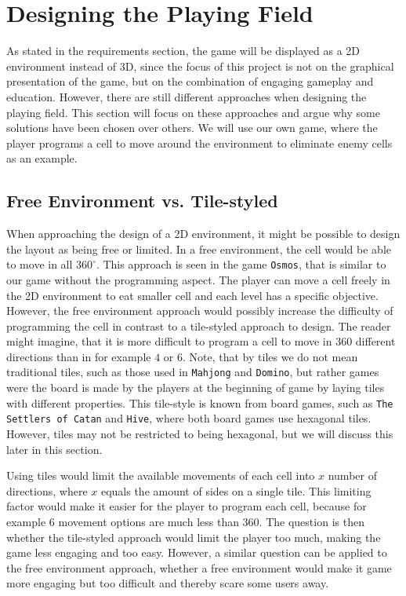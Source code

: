 \section{Designing the Playing Field}
\label{sec:designing_playing_field}

As stated in the requirements section, the game will be displayed as a 2D environment instead of 3D, since the focus of this project is not on the graphical presentation of the game, but on the combination of engaging gameplay and education.
However, there are still different approaches when designing the playing field.
This section will focus on these approaches and argue why some solutions have been chosen over others.
We will use our own game, where the player programs a cell to move around the environment to eliminate enemy cells as an example.

\subsection{Free Environment vs. Tile-styled}
When approaching the design of a 2D environment, it might be possible to design the layout as being free or limited.
In a free environment, the cell would be able to move in all $360^{\circ}$.
This approach is seen in the game \texttt{Osmos}, that is similar to our game without the programming aspect.
The player can move a cell freely in the 2D environment to eat smaller cell and each level has a specific objective.
However, the free environment approach would possibly increase the difficulty of programming the cell in contrast to a tile-styled approach to design.
The reader might imagine, that it is more difficult to program a cell to move in $360$ different directions than in for example $4$ or $6$.
Note, that by tiles we do not mean traditional tiles, such as those used in \texttt{Mahjong} and \texttt{Domino}, but rather games were the board is made by the players at the beginning of game by laying tiles with different properties.
This tile-style is known from board games, such as \texttt{The Settlers of Catan} and \texttt{Hive}, where both board games use hexagonal tiles.
However, tiles may not be restricted to being hexagonal, but we will discuss this later in this section.\newline

Using tiles would limit the available movements of each cell into $x$ number of directions, where $x$ equals the amount of sides on a single tile.
This limiting factor would make it easier for the player to program each cell, because for example $6$ movement options are much less than $360$.
The question is then whether the tile-styled approach would limit the player too much, making the game less engaging and too easy.
However, a similar question can be applied to the free environment approach, whether a free environment would make it game more engaging but too difficult and thereby scare some users away.\newline

